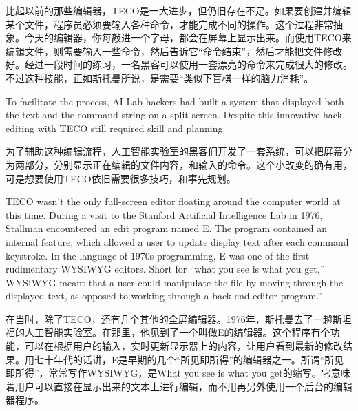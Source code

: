 \ifdefined\chs
比起以前的那些编辑器，TECO是一大进步，但仍旧存在不足。如果要创建并编辑某个文件，程序员必须要输入各种命令，才能完成不同的操作。这个过程非常抽象。今天的编辑器，你每敲进一个字母，都会在屏幕上显示出来。而使用TECO来编辑文件，则需要输入一些命令，然后告诉它``命令结束''，然后才能把文件修改好。经过一段时间的练习，一名黑客可以使用一套漂亮的命令来完成很大的修改。不过这种技能，正如斯托曼所说，是需要``类似下盲棋一样的脑力消耗''。
\fi

\ifdefined\eng
To facilitate the process, AI Lab hackers had built a system that displayed both the text and the command string on a split screen. Despite this innovative hack, editing with TECO still required skill and planning.
\fi

\ifdefined\chs
为了辅助这种编辑流程，人工智能实验室的黑客们开发了一套系统，可以把屏幕分为两部分，分别显示正在编辑的文件内容，和输入的命令。这个小改变的确有用，可是想要使用TECO依旧需要很多技巧，和事先规划。
\fi

\ifdefined\eng
TECO wasn't the only full-screen editor floating around the computer world at this time. During a visit to the Stanford Artificial Intelligence Lab in 1976, Stallman encountered an edit program named E. The program contained an internal feature, which allowed a user to update display text after each command keystroke. In the language of 1970s programming, E was one of the first rudimentary WYSIWYG editors. Short for ``what you see is what you get,'' WYSIWYG meant that a user could manipulate the file by moving through the displayed text, as opposed to working through a back-end editor program.''
\fi

\ifdefined\chs
在当时，除了TECO，还有几个其他的全屏编辑器。1976年，斯托曼去了一趟斯坦福的人工智能实验室。在那里，他见到了一个叫做E的编辑器。这个程序有个功能，可以在根据用户的输入，实时更新显示器上的内容，让用户看到最新的修改结果。用七十年代的话讲，E是早期的几个``所见即所得''的编辑器之一。所谓``所见即所得''，常常写作WYSIWYG，是What you see is what you get的缩写。它意味着用户可以直接在显示出来的文本上进行编辑，而不用再另外使用一个后台的编辑器程序。
\fi

